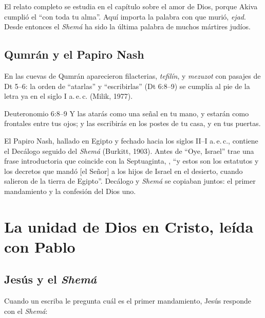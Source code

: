 
El relato completo se estudia en el capítulo sobre el amor de Dios, porque Akiva cumplió el ``con toda tu alma''. Aquí importa la palabra con que murió, \emph{ejad}. Desde entonces el \emph{Shemá} ha sido la última palabra de muchos mártires judíos.

\subsection{Qumrán y el Papiro Nash}
En las cuevas de Qumrán aparecieron filacterias, \emph{tefilín}, y \emph{mezuzot} con pasajes de Dt 5--6: la orden de ``atarlas'' y ``escribirlas'' (Dt 6:8--9) se cumplía al pie de la letra ya en el siglo I a.\,e.\,c. (Milik, 1977).

\begin{verso}{Deuteronomio 6:8–9}
Y las atarás como una señal en tu mano, y estarán como frontales entre tus ojos; y las escribirás en los postes de tu casa, y en tus puertas.
\end{verso}

El Papiro Nash, hallado en Egipto y fechado hacia los siglos II--I a.\,e.\,c., contiene el Decálogo seguido del \emph{Shemá} (Burkitt, 1903). Antes de ``Oye, Israel'' trae una frase introductoria que coincide con la Septuaginta, , ``y estos son los estatutos y los decretos que mandó [el Señor] a los hijos de Israel en el desierto, cuando salieron de la tierra de Egipto''. Decálogo y \emph{Shemá} se copiaban juntos: el primer mandamiento y la confesión del Dios uno.


\section{La unidad de Dios en Cristo, leída con Pablo}\label{sec:cristo-uno}

\subsection{Jesús y el \emph{Shemá}}
Cuando un escriba le pregunta cuál es el primer mandamiento, Jesús responde con el \emph{Shemá}:

